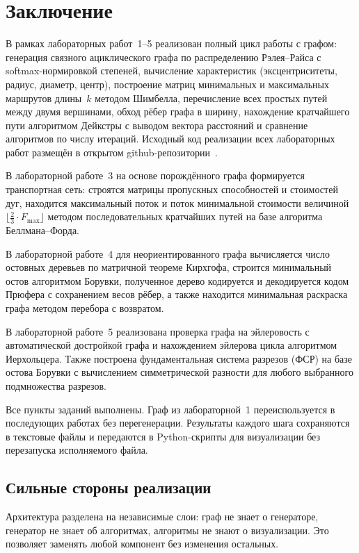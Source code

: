 \section*{Заключение}

В рамках лабораторных работ~1--5 реализован полный цикл работы
с графом: генерация связного ациклического графа по распределению
Рэлея--Райса с softmax-нормировкой степеней, вычисление характеристик
(эксцентриситеты, радиус, диаметр, центр), построение матриц
минимальных и максимальных маршрутов длины~$k$ методом Шимбелла,
перечисление всех простых путей между двумя вершинами, обход рёбер
графа в ширину, нахождение кратчайшего пути алгоритмом Дейкстры
с выводом вектора расстояний и сравнение алгоритмов по числу итераций.
Исходный код реализации всех лабораторных работ размещён в открытом
github-репозитории~\cite{github}.

В лабораторной работе~3 на основе порождённого графа формируется
транспортная сеть: строятся матрицы пропускных способностей и
стоимостей дуг, находится максимальный поток и поток минимальной стоимости величиной
$\lfloor\tfrac{2}{3} \cdot F_{\max}\rfloor$ методом последовательных
кратчайших путей на базе алгоритма Беллмана--Форда.

В лабораторной работе~4 для неориентированного графа вычисляется
число остовных деревьев по матричной теореме Кирхгофа, строится
минимальный остов алгоритмом Борувки, полученное дерево кодируется
и декодируется кодом Прюфера с сохранением весов рёбер, а также
находится минимальная раскраска графа методом перебора с возвратом.

В лабораторной работе~5 реализована проверка графа на эйлеровость с автоматической достройкой графа и нахождением эйлерова цикла алгоритмом Иерхольцера. Также построена фундаментальная система разрезов (ФСР) на базе остова Борувки с вычислением симметрической разности для любого выбранного подмножества разрезов.

Все пункты заданий выполнены. Граф из лабораторной~1
переиспользуется в последующих работах без перегенерации. Результаты
каждого шага сохраняются в текстовые файлы и передаются
в Python-скрипты для визуализации без перезапуска исполняемого файла.

\subsection*{Сильные стороны реализации}

Архитектура разделена на независимые слои: граф не знает о
генераторе, генератор не знает об алгоритмах, алгоритмы не
знают о визуализации. Это позволяет заменять любой компонент
без изменения остальных.

